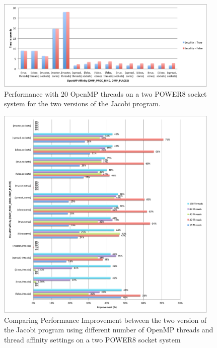 \begin{figure}[h!]
  \centering
  \includegraphics[height=0.4\textwidth, width=0.95\textwidth]{./Images/20Perf.pdf}
       \caption{Performance with 20 OpenMP threads on a two POWER8 socket system for the two versions of the Jacobi program.}
       \label{fig:20th}
\end{figure}
%
\begin{figure}[H]
  \centering
  \includegraphics[height=1.2\textwidth, width=0.95\textwidth]{./Images/ImpAllV.pdf}
       \caption{Comparing Performance Improvement between the two version of the Jacobi program using 
       different number of OpenMP threads and thread affinity settings on a two POWER8 socket system}
       \label{fig:imp}
\end{figure}


